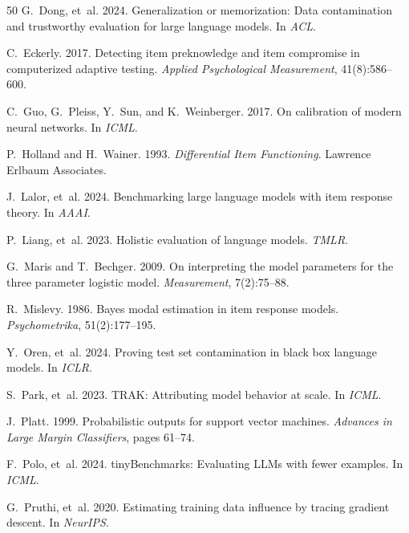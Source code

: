 \documentclass[11pt,a4paper]{article}
\begin{document}
\begin{thebibliography}{50}
G.~Dong, et~al. 2024.
Generalization or memorization: Data contamination and trustworthy evaluation for large language models.
In \textit{ACL}.

C.~Eckerly. 2017.
Detecting item preknowledge and item compromise in computerized adaptive testing.
\textit{Applied Psychological Measurement}, 41(8):586--600.

C.~Guo, G.~Pleiss, Y.~Sun, and K.~Weinberger. 2017.
On calibration of modern neural networks.
In \textit{ICML}.

P.~Holland and H.~Wainer. 1993.
\textit{Differential Item Functioning}.
Lawrence Erlbaum Associates.

J.~Lalor, et~al. 2024.
Benchmarking large language models with item response theory.
In \textit{AAAI}.

P.~Liang, et~al. 2023.
Holistic evaluation of language models.
\textit{TMLR}.

G.~Maris and T.~Bechger. 2009.
On interpreting the model parameters for the three parameter logistic model.
\textit{Measurement}, 7(2):75--88.

R.~Mislevy. 1986.
Bayes modal estimation in item response models.
\textit{Psychometrika}, 51(2):177--195.

Y.~Oren, et~al. 2024.
Proving test set contamination in black box language models.
In \textit{ICLR}.

S.~Park, et~al. 2023.
TRAK: Attributing model behavior at scale.
In \textit{ICML}.

J.~Platt. 1999.
Probabilistic outputs for support vector machines.
\textit{Advances in Large Margin Classifiers}, pages 61--74.

F.~Polo, et~al. 2024.
tinyBenchmarks: Evaluating LLMs with fewer examples.
In \textit{ICML}.

G.~Pruthi, et~al. 2020.
Estimating training data influence by tracing gradient descent.
In \textit{NeurIPS}.


\end{thebibliography}
\end{document}
